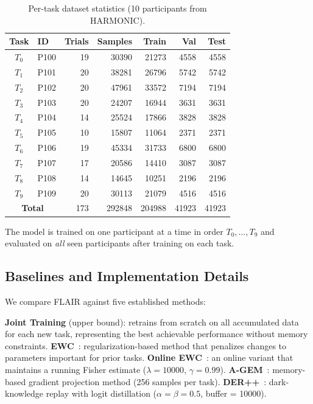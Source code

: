 \documentclass[3p,times,procedia]{elsarticle}
\begin{document}
\begin{table}[h!]
\caption{Per-task dataset statistics (10 participants from HARMONIC).}
\label{tab:tasks}
\centering
\footnotesize
\setlength{\tabcolsep}{4pt}
\begin{tabular}{@{}clrrrrr@{}}
\toprule
\textbf{Task} & \textbf{ID} & \textbf{Trials} & \textbf{Samples} & \textbf{Train} & \textbf{Val} & \textbf{Test} \\
\midrule
$T_0$ & P100 & 19 & 30390 & 21273 & 4558 & 4558 \\
$T_1$ & P101 & 20 & 38281 & 26796 & 5742 & 5742 \\
$T_2$ & P102 & 20 & 47961 & 33572 & 7194 & 7194 \\
$T_3$ & P103 & 20 & 24207 & 16944 & 3631 & 3631 \\
$T_4$ & P104 & 14 & 25524 & 17866 & 3828 & 3828 \\
$T_5$ & P105 & 10 & 15807 & 11064 & 2371 & 2371 \\
$T_6$ & P106 & 19 & 45334 & 31733 & 6800 & 6800 \\
$T_7$ & P107 & 17 & 20586 & 14410 & 3087 & 3087 \\
$T_8$ & P108 & 14 & 14645 & 10251 & 2196 & 2196 \\
$T_9$ & P109 & 20 & 30113 & 21079 & 4516 & 4516 \\
\midrule
\multicolumn{2}{c}{\textbf{Total}} & 173 & 292848 & 204988 & 41923 & 41923 \\
\bottomrule
\end{tabular}
\end{table}

The model is trained on one participant at a time in order $T_0, \ldots, T_9$ and evaluated on \emph{all} seen participants after training on each task.

\subsection{Baselines and Implementation Details}

We compare FLAIR against five established methods:

\textbf{Joint Training} (upper bound): retrains from scratch on all accumulated data for each new task, representing the best achievable performance without memory constraints. \textbf{EWC}~\cite{kirkpatrick2017overcoming}: regularization-based method that penalizes changes to parameters important for prior tasks. \textbf{Online EWC}~\cite{schwarz2018progress}: an online variant that maintains a running Fisher estimate ($\lambda = 10000$, $\gamma = 0.99$). \textbf{A-GEM}~\cite{chaudhry2018efficient}: memory-based gradient projection method (256 samples per task). \textbf{DER++}~\cite{buzzega2020dark}: dark-knowledge replay with logit distillation ($\alpha = \beta = 0.5$, buffer = 10000).
\end{document}
